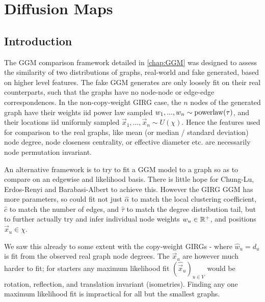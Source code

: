 \chapter{Diffusion Maps}
\label{chap:diff_maps}
\minitoc
\section{Introduction}

The GGM comparison framework detailed in \cref{chap:GGM} was designed to assess the similarity of two distributions of graphs, real-world and fake generated, based on higher level features. The fake GGM generates are only loosely fit on their real counterparts, such that the graphs have no node-node or edge-edge correspondences. In the non-copy-weight GIRG case, the $n$ nodes of the generated graph have their weights iid power law sampled $w_1, ..., w_n \sim \operatorname{powerlaw}(\tau)$, and their locations iid uniformly sampled $\vec{x}_1, ..., \vec{x}_n \sim U(\chi)$. Hence the features used for comparison to the real graphs, like mean (or median / standard deviation) node degree, node closeness centrality, or effective diameter etc. are necessarily node permutation invariant.

An alternative framework is to try to fit a GGM model to a graph so as to compare on an edgewise and likelihood basis. There is little hope for Chung-Lu, Erdos-Renyi and Barabasi-Albert to achieve this. However the GIRG GGM has more parameters, so could fit not just $\hat{\alpha}$ to match the local clustering coefficient, $\hat{c}$ to match the number of edges, and $\hat{\tau}$ to match the degree distribution tail, but to further actually try and infer individual node weights $w_u \in \mathbb{R}^+$, and positions $\vec{x}_u \in \chi$. 

We saw this already to some extent with the copy-weight GIRGs - where $\hat{w}_u = d_u$ is fit from the observed real graph node degrees. The $\vec{x}_u$ are however much harder to fit; for starters any maximum likelihood fit $(\hat{\vec{x}}_u)_{u \in V}$ would be rotation, reflection, and translation invariant (isometries). Finding any one maximum likelihood fit is impractical for all but the smallest graphs.

